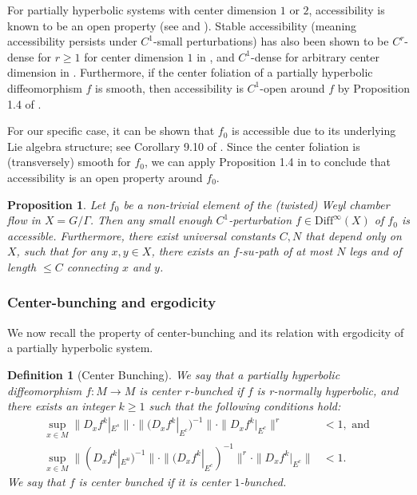 \documentclass[11pt]{amsart}
\numberwithin{equation}{section}
\theoremstyle{plain}
\newtheorem{prop}[thm]{Proposition}
\newtheorem{defi}{Definition}[section]
\begin{document}
For partially hyperbolic systems with center dimension $1$ or $2$, accessibility is known to be an open property (see \cite{Didier} and \cite{AV}). Stable accessibility (meaning accessibility persists under $C^1$-small perturbations) has also been shown to be $C^r$-dense for $r\ge 1$ for center dimension $1$ in \cite{RHU}, and $C^1$-dense for arbitrary center dimension in \cite{DW}. Furthermore, if the center foliation of a partially hyperbolic diffeomorphism $f$ is smooth, then accessibility is $C^1$-open around $f$ by Proposition 1.4 of \cite{GPS}.

For our specific case, it can be shown that $f_0$ is accessible due to its underlying Lie algebra structure; see Corollary 9.10 of \cite{VinWang}. Since the center foliation is (transversely) smooth for $f_0$, we can apply Proposition 1.4 in \cite{GPS} to conclude that accessibility is an open property around $f_0$.

\begin{prop}\label{faccess}
Let $f_0$ be a non-trivial element of the (twisted) Weyl chamber flow in $X=G/\Gamma$. Then any small enough $C^1$-perturbation $f\in \mathrm{Diff}^\infty(X)$ of $f_0$ is accessible. Furthermore, there exist universal constants $C,N$ that depend only on $X$, such that for any $x,y\in X$, there exists an $f$-$su$-path of at most $N$ legs and of length $\le C$ connecting $x$ and $y$.
\end{prop}

\subsubsection{Center-bunching and ergodicity}
We now recall the property of center-bunching and its relation with ergodicity of a partially hyperbolic system.

\begin{defi}[Center Bunching]
We say that a partially hyperbolic diffeomorphism $f:M\to M$ is \emph{center $r$-bunched} if $f$ is r-normally hyperbolic, and there exists an integer $k \ge 1$ such that the following conditions hold:
\begin{align*}
\sup_{x\in M} \|D_xf^k|_{E^s}\|\cdot \|(D_xf^k|_{E^c})^{-1}\|\cdot \|D_xf^k|_{E^c}\|^r &<1, \text{ and } \\
\sup_{x\in M} \|(D_xf^k|_{E^u})^{-1}\|\cdot \|(D_xf^k|_{E^c})^{-1}\|^r\cdot \|D_xf^k|_{E^c}\| &<1.
\end{align*}
We say that $f$ is \emph{center bunched} if it is center $1$-bunched.
\end{defi}
\end{document}
